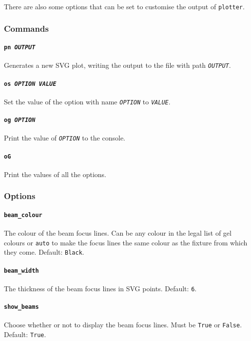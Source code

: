 \documentclass[a4paper]{article}
\begin{document}
There are also some options that can be set to customise the output of 
\texttt{plotter}.

\subsubsection{Commands}

\paragraph{\texttt{pn \textit{OUTPUT}}}
Generates a new SVG plot, writing the output to the file with path 
\texttt{\textit{OUTPUT}}.

\paragraph{\texttt{os \textit{OPTION VALUE}}}
Set the value of the option with name \texttt{\textit{OPTION}} to 
\texttt{\textit{VALUE}}.

\paragraph{\texttt{og \textit{OPTION}}}
Print the value of \texttt{\textit{OPTION}} to the console.

\paragraph{\texttt{oG}}
Print the values of all the options.

\subsubsection{Options}

\paragraph{\texttt{beam\_colour}}
The colour of the beam focus lines. Can be any colour in the legal list of 
gel colours or \texttt{auto} to make the focus lines the same colour as the 
fixture from which they come. Default: \texttt{Black}.

\paragraph{\texttt{beam\_width}}
The thickness of the beam focus lines in SVG points. Default: \texttt{6}.

\paragraph{\texttt{show\_beams}}
Choose whether or not to display the beam focus lines. Must be \texttt{True} 
or \texttt{False}. Default: \texttt{True}.
\end{document}
